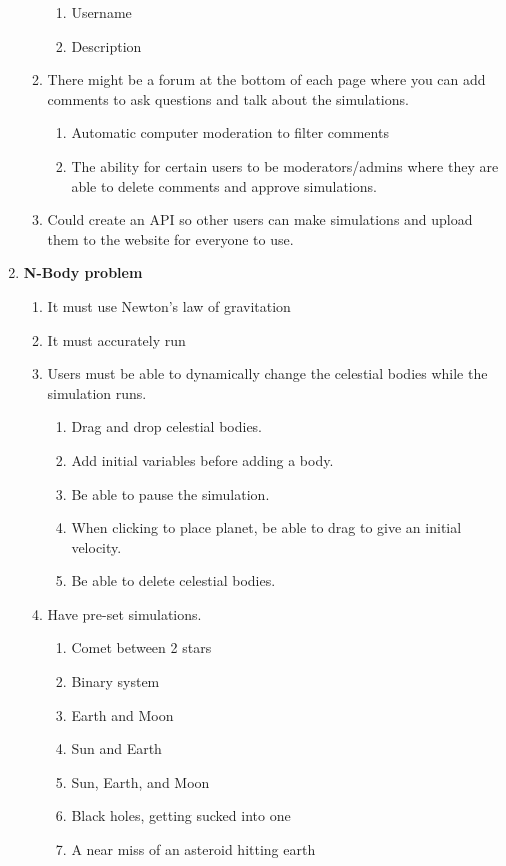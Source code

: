 \documentclass[12pt]{article}
\begin{document}
\begin{enumerate}[label=\textbf{\arabic*}.]
\begin{enumerate}[label*=\textbf{\arabic*}.]
\begin{enumerate}[label*=\textbf{\arabic*}.]
            \item Username
            \item Description
        \end{enumerate}
        \item There might be a forum at the bottom of each page where you can add comments to ask questions and talk about the simulations.
        \begin{enumerate}[label*=\textbf{\arabic*}.]
            \item Automatic computer moderation to filter comments
            \item The ability for certain users to be moderators/admins where they are able to delete comments and approve simulations.
        \end{enumerate}
        \item Could create an API so other users can make simulations and upload them to the website for everyone to use.
    \end{enumerate}
    \item \textbf{N-Body problem}
    \begin{enumerate}[label*=\textbf{\arabic*}.]
        \item It must use Newton's law of gravitation 
        \item It must accurately run
        \item Users must be able to dynamically change the celestial bodies while the simulation runs.
        \begin{enumerate}[label*=\textbf{\arabic*}.]
            \item Drag and drop celestial bodies.
            \item Add initial variables before adding a body.
            \item Be able to pause the simulation.
            \item When clicking to place planet, be able to drag to give an initial velocity.
            \item Be able to delete celestial bodies.
        \end{enumerate}
        \item Have pre-set simulations.
        \begin{enumerate}[label*=\textbf{\arabic*}.]
            \item Comet between 2 stars
            \item Binary system
            \item Earth and Moon
            \item Sun and Earth
            \item Sun, Earth, and Moon
            \item Black holes, getting sucked into one
            \item A near miss of an asteroid hitting earth
        \end{enumerate}
        

\end{enumerate}
\end{enumerate}
\end{document}
